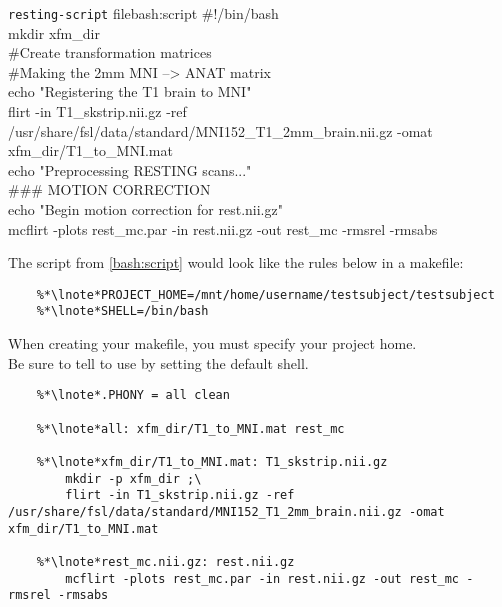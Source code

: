 \begin{bash}{\texttt{resting-script} file}{bash:script}
\#!/bin/bash \\

mkdir xfm_dir \\

\#Create transformation matrices \\

\#Making the 2mm MNI --> ANAT matrix \\
echo "Registering the T1 brain to MNI" \\
flirt -in T1_skstrip.nii.gz -ref /usr/share/fsl/data/standard/MNI152_T1_2mm_brain.nii.gz -omat xfm_dir/T1_to_MNI.mat \\
echo "Preprocessing RESTING scans..." \\

\#\#\# MOTION CORRECTION \\
echo "Begin motion correction for rest.nii.gz" \\
mcflirt -plots rest_mc.par -in rest.nii.gz -out rest_mc -rmsrel -rmsabs 
\end{bash}

\setcounter{codehighlight}{0}
The script from \autoref{bash:script} would look like the rules below in a makefile: %
\begin{lstlisting}
	%*\lnote*PROJECT_HOME=/mnt/home/username/testsubject/testsubject
	%*\lnote*SHELL=/bin/bash
\end{lstlisting}
When creating your makefile, you must specify your project home. \\
\indent{}Be sure to tell \maken{} to use \bashn{} by setting the default shell. \\	

\begin{lstlisting}
	%*\lnote*.PHONY = all clean	
	
	%*\lnote*all: xfm_dir/T1_to_MNI.mat rest_mc

	%*\lnote*xfm_dir/T1_to_MNI.mat: T1_skstrip.nii.gz 
		mkdir -p xfm_dir ;\
		flirt -in T1_skstrip.nii.gz -ref /usr/share/fsl/data/standard/MNI152_T1_2mm_brain.nii.gz -omat xfm_dir/T1_to_MNI.mat

	%*\lnote*rest_mc.nii.gz: rest.nii.gz
		mcflirt -plots rest_mc.par -in rest.nii.gz -out rest_mc -rmsrel -rmsabs
\end{lstlisting}

